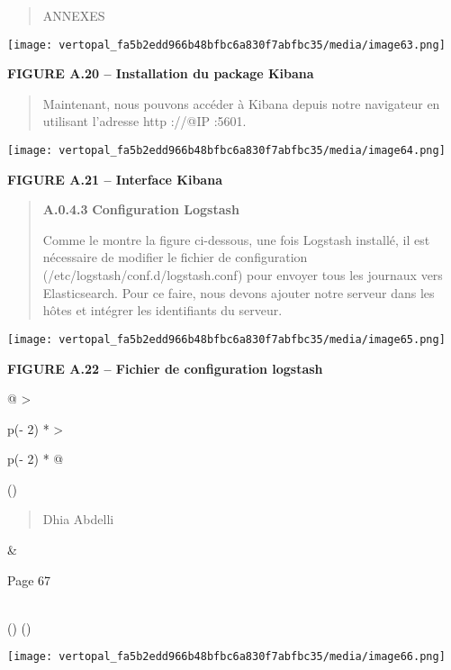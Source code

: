 \documentclass[
]{article}
\begin{document}
\begin{quote}
ANNEXES
\end{quote}

\texttt{[image: vertopal\_fa5b2edd966b48bfbc6a830f7abfbc35/media/image63.png]}

\textbf{FIGURE A.20 -- Installation du package Kibana}

\begin{quote}
Maintenant, nous pouvons accéder à Kibana depuis notre navigateur en
utilisant l'adresse http ://@IP :5601.
\end{quote}

\texttt{[image: vertopal\_fa5b2edd966b48bfbc6a830f7abfbc35/media/image64.png]}

\textbf{FIGURE A.21 -- Interface Kibana}

\begin{quote}
\textbf{A.0.4.3} \textbf{Configuration Logstash}

Comme le montre la figure ci-dessous, une fois Logstash installé, il est
nécessaire de modifier le fichier de configuration
(/etc/logstash/conf.d/logstash.conf) pour envoyer tous les journaux vers
Elasticsearch. Pour ce faire, nous devons ajouter notre serveur dans les
hôtes et intégrer les identifiants du serveur.
\end{quote}

\texttt{[image: vertopal\_fa5b2edd966b48bfbc6a830f7abfbc35/media/image65.png]}

\textbf{FIGURE A.22 -- Fichier de configuration logstash}

\begin{longtable}[]{@{}
  >{\raggedright\arraybackslash}p{(\columnwidth - 2\tabcolsep) * }
  >{\raggedright\arraybackslash}p{(\columnwidth - 2\tabcolsep) * }@{}}
\toprule()
\begin{minipage}[b]{\linewidth}\raggedright
\begin{quote}
Dhia Abdelli
\end{quote}
\end{minipage} & \begin{minipage}[b]{\linewidth}\raggedright
Page 67
\end{minipage} \\
\midrule()
\endhead
\bottomrule()
\end{longtable}

\texttt{[image: vertopal\_fa5b2edd966b48bfbc6a830f7abfbc35/media/image66.png]}
\end{document}
